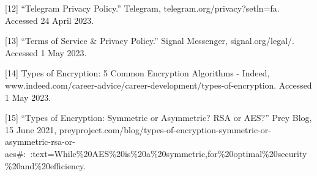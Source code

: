 \documentclass[12pt]{article}
\begin{document}
[12] “Telegram Privacy Policy.” Telegram, telegram.org/privacy?setln=fa. Accessed 24 April 2023.

[13] “Terms of Service & Privacy Policy.” Signal Messenger, signal.org/legal/. Accessed 1 May 2023.

[14] Types of Encryption: 5 Common Encryption Algorithms - Indeed, www.indeed.com/career-advice/career-development/types-of-encryption. Accessed 1 May 2023.

[15] “Types of Encryption: Symmetric or Asymmetric? RSA or AES?” Prey Blog, 15 June 2021, preyproject.com/blog/types-of-encryption-symmetric-or-asymmetric-rsa-or-\\ aes#:~:text=While\%20AES\%20is\%20a\%20symmetric,for\%20optimal\%20security\%20and\%20efficiency. 











\end{document}
